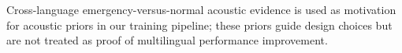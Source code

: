 Cross-language emergency-versus-normal acoustic evidence is used as motivation for acoustic priors in our training pipeline; these priors guide design choices but are not treated as proof of multilingual performance improvement.

